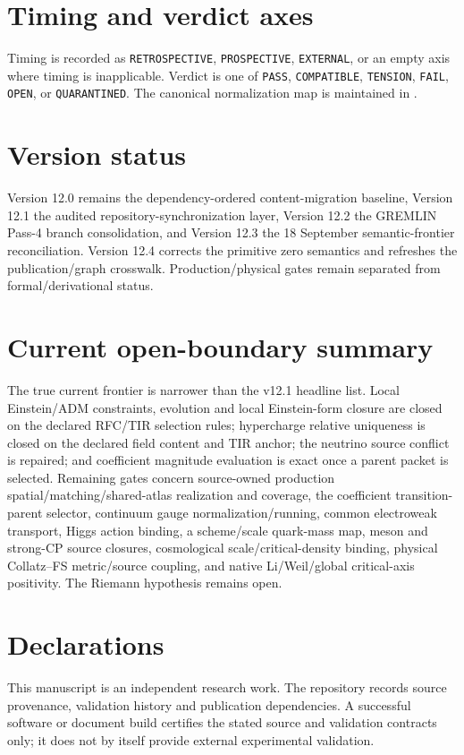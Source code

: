 \section*{Timing and verdict axes}
Timing is recorded as \texttt{RETROSPECTIVE}, \texttt{PROSPECTIVE}, \texttt{EXTERNAL}, or an empty axis where timing is inapplicable. Verdict is one of \texttt{PASS}, \texttt{COMPATIBLE}, \texttt{TENSION}, \texttt{FAIL}, \texttt{OPEN}, or \texttt{QUARANTINED}. The canonical normalization map is maintained in .

\section*{Version status}
Version 12.0 remains the dependency-ordered content-migration baseline, Version 12.1 the audited repository-synchronization layer, Version 12.2 the GREMLIN Pass-4 branch consolidation, and Version 12.3 the 18 September semantic-frontier reconciliation. Version 12.4 corrects the primitive zero semantics and refreshes the publication/graph crosswalk. Production/physical gates remain separated from formal/derivational status.

\section*{Current open-boundary summary}
The true current frontier is narrower than the v12.1 headline list. Local Einstein/ADM constraints, evolution and local Einstein-form closure are closed on the declared RFC/TIR selection rules; hypercharge relative uniqueness is closed on the declared field content and TIR anchor; the neutrino source conflict is repaired; and coefficient magnitude evaluation is exact once a parent packet is selected. Remaining gates concern source-owned production spatial/matching/shared-atlas realization and coverage, the coefficient transition-parent selector, continuum gauge normalization/running, common electroweak transport, Higgs action binding, a scheme/scale quark-mass map, meson and strong-CP source closures, cosmological scale/critical-density binding, physical Collatz--FS metric/source coupling, and native Li/Weil/global critical-axis positivity. The Riemann hypothesis remains open.

\section*{Declarations}
This manuscript is an independent research work. The repository records source provenance, validation history and publication dependencies. A successful software or document build certifies the stated source and validation contracts only; it does not by itself provide external experimental validation.

\cleardoublepage
